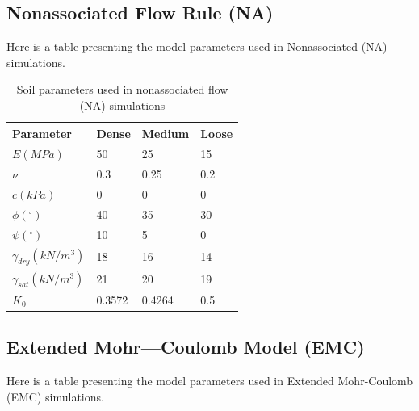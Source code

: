 \documentclass[a4paper, nobind]{templates/ociamthesis}
\begin{document}
\hypertarget{nonassociated-flow-rule-na-1}{%
\subsection{Nonassociated Flow Rule (NA)}\label{nonassociated-flow-rule-na-1}}

Here is a table presenting the model parameters used in Nonassociated (NA) simulations.

\begin{table}[H]
\centering
{%
\begin{tabular}{@{}llll@{}}
\toprule
Parameter                    & Dense       & Medium      & Loose     \\ \midrule
$E (MPa)$                    & 50          & 25          & 15        \\
$\nu$                        & 0.3         & 0.25        & 0.2       \\
$c (kPa)$                    & 0           & 0           & 0         \\
$\phi(^{\circ})$             & 40          & 35          & 30        \\
$\psi(^{\circ})$             & 10          & 5           & 0         \\
$\gamma_{dry}(kN/m^3)$       & 18          & 16          & 14        \\
$\gamma_{sat}(kN/m^3)$       & 21          & 20          & 19        \\
$K_0$                        & 0.3572      & 0.4264      & 0.5       \\ \bottomrule
\end{tabular}%
}
\caption{Soil parameters used in nonassociated flow (NA) simulations}
\label{tab:Soil parameters used in nonassociated flow NA simulations}
\end{table}

\hypertarget{extended-mohrcoulomb-model-emc-1}{%
\subsection{Extended Mohr---Coulomb Model (EMC)}\label{extended-mohrcoulomb-model-emc-1}}

Here is a table presenting the model parameters used in Extended Mohr-Coulomb (EMC) simulations.
\end{document}
